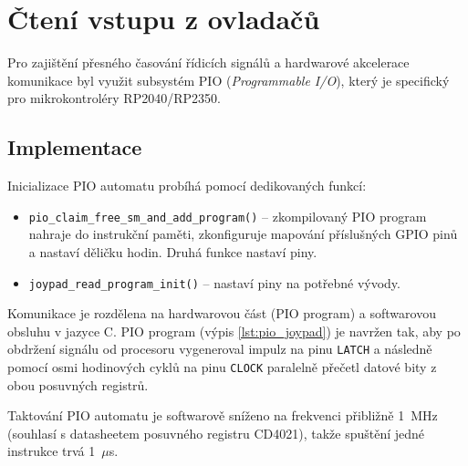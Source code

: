 \section{Čtení vstupu z ovladačů}

Pro zajištění přesného časování řídicích signálů a hardwarové akcelerace komunikace byl využit
subsystém PIO (\textit{Programmable I/O}), který je specifický pro mikrokontroléry RP2040/RP2350.

\subsection{Implementace}

Inicializace PIO automatu probíhá pomocí dedikovaných funkcí:

\begin{itemize}
    \item \texttt{pio\_claim\_free\_sm\_and\_add\_program()} -- zkompilovaný PIO program nahraje do
        instrukční paměti, zkonfiguruje mapování příslušných GPIO pinů a nastaví děličku hodin.
        Druhá funkce nastaví piny.
    \item \texttt{joypad\_read\_program\_init()} -- nastaví piny na potřebné vývody.
\end{itemize}

Komunikace je rozdělena na hardwarovou část (PIO program) a softwarovou obsluhu v jazyce C. PIO
program (výpis \ref{lst:pio_joypad}) je navržen tak, aby po obdržení signálu od procesoru
vygeneroval impulz na pinu \texttt{LATCH} a následně pomocí osmi hodinových cyklů na pinu
\texttt{CLOCK} paralelně přečetl datové bity z obou posuvných registrů.

Taktování PIO automatu je softwarově sníženo na frekvenci přibližně 1~MHz (souhlasí s datasheetem
posuvného registru CD4021), takže spuštění jedné instrukce trvá 1~$\mu$s.

